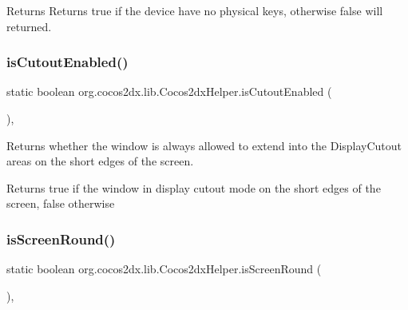 \begin{DoxyReturn}{Returns}
Returns {\ttfamily true} if the device have no physical keys, otherwise {\ttfamily false} will returned. 
\end{DoxyReturn}
\mbox{\label{classorg_1_1cocos2dx_1_1lib_1_1Cocos2dxHelper_ae151f180c0282d7f6ff2c50037318766}} 
\subsubsection{\texorpdfstring{is\+Cutout\+Enabled()}{isCutoutEnabled()}}
{\footnotesize\ttfamily static boolean org.\+cocos2dx.\+lib.\+Cocos2dx\+Helper.\+is\+Cutout\+Enabled (\begin{DoxyParamCaption}{ }\end{DoxyParamCaption})\hspace{0.3cm}{\ttfamily [inline]}, {\ttfamily [static]}}

Returns whether the window is always allowed to extend into the Display\+Cutout areas on the short edges of the screen.

\begin{DoxyReturn}{Returns}
true if the window in display cutout mode on the short edges of the screen, false otherwise 
\end{DoxyReturn}
\mbox{\label{classorg_1_1cocos2dx_1_1lib_1_1Cocos2dxHelper_a0292754d83110dd0261f58e405b4b9ff}} 
\subsubsection{\texorpdfstring{is\+Screen\+Round()}{isScreenRound()}}
{\footnotesize\ttfamily static boolean org.\+cocos2dx.\+lib.\+Cocos2dx\+Helper.\+is\+Screen\+Round (\begin{DoxyParamCaption}{ }\end{DoxyParamCaption})\hspace{0.3cm}{\ttfamily [inline]}, {\ttfamily [static]}}

